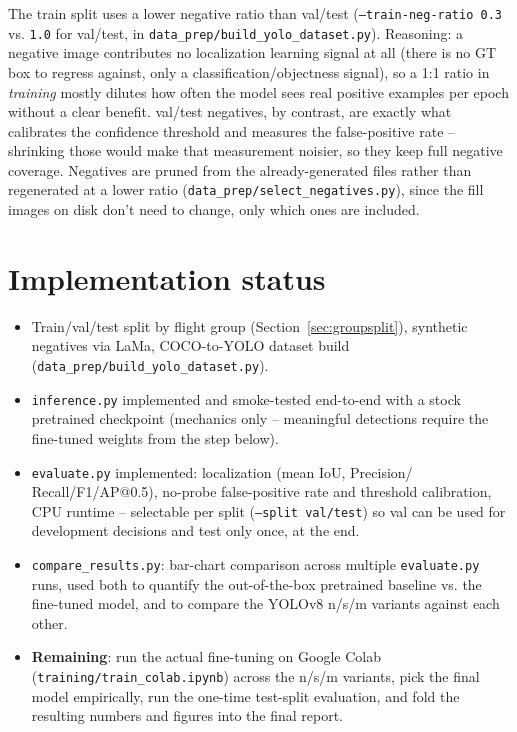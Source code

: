 \documentclass[11pt,a4paper]{article}
\begin{document}
The train split uses a lower negative ratio than val/test (\texttt{--train-neg-ratio 0.3} vs.
\texttt{1.0} for val/test, in \texttt{data\_prep/build\_yolo\_dataset.py}). Reasoning: a
negative image contributes no localization learning signal at all (there is no GT box to
regress against, only a classification/objectness signal), so a 1:1 ratio in \emph{training}
mostly dilutes how often the model sees real positive examples per epoch without a clear
benefit. val/test negatives, by contrast, are exactly what calibrates the confidence threshold
and measures the false-positive rate -- shrinking those would make that measurement noisier, so
they keep full negative coverage. Negatives are pruned from the already-generated files rather
than regenerated at a lower ratio (\texttt{data\_prep/select\_negatives.py}), since the fill
images on disk don't need to change, only which ones are included.

\section{Implementation status}
\label{sec:nextsteps}

\begin{itemize}[nosep]
    \item[\checkmark] Train/val/test split by flight group (Section~\ref{sec:groupsplit}),
          synthetic negatives via LaMa, COCO-to-YOLO dataset build
          (\texttt{data\_prep/build\_yolo\_dataset.py}).
    \item[\checkmark] \texttt{inference.py} implemented and smoke-tested end-to-end with a stock
          pretrained checkpoint (mechanics only -- meaningful detections require the fine-tuned
          weights from the step below).
    \item[\checkmark] \texttt{evaluate.py} implemented: localization (mean IoU, Precision/
          Recall/F1/AP@0.5), no-probe false-positive rate and threshold calibration, CPU runtime
          -- selectable per split (\texttt{--split val/test}) so val can be used for
          development decisions and test only once, at the end.
    \item[\checkmark] \texttt{compare\_results.py}: bar-chart comparison across multiple
          \texttt{evaluate.py} runs, used both to quantify the out-of-the-box pretrained baseline
          vs. the fine-tuned model, and to compare the YOLOv8 n/s/m variants against each other.
    \item[ ] \textbf{Remaining}: run the actual fine-tuning on Google Colab
          (\texttt{training/train\_colab.ipynb}) across the n/s/m variants, pick the final model
          empirically, run the one-time test-split evaluation, and fold the resulting numbers
          and figures into the final report.
\end{itemize}
\end{document}
